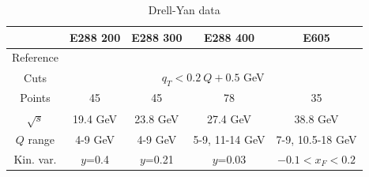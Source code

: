 \documentclass[aps,preprintnumbers,showpacs,nofootinbib,superscriptaddress,floatfix]{revtex4}
\begin{document}
\begin{table}[h]
\begin{center}
\renewcommand{\tabcolsep}{0.4pc} %
\renewcommand{\arraystretch}{1.2} %
\begin{tabular}{|c|c|c|c|c|}
 \hline
 ~                        &  E288 200    &  E288 300        &  E288 400          &  E605                \\
 \hline
Reference               &  \cite{Ito:1980ev}  &   \cite{Ito:1980ev}  &  \cite{Ito:1980ev}  &   \cite{Moreno:1990sf}  \\
\hline
Cuts             & \multicolumn{4}{c|}{$q_T < 0.2\ Q +0.5$ GeV}
\\
 \hline
 Points                   &      45      &   45             &       78           &     35               \\
 \hline
 $\sqrt{s}$               &    19.4 GeV   &   23.8 GeV        &      27.4 GeV    &  38.8 GeV           \\
\hline
$Q$ range                 &  4-9 GeV      &  4-9 GeV         &  5-9, 11-14 GeV   &  7-9, 10.5-18 GeV   \\
 \hline
 Kin. var.           & $y$=0.4         &  $y$=0.21          &   $y$=0.03         &    $-0.1<x_F< 0.2$         \\
\hline
 \end{tabular}
 \caption{Drell-Yan data}
\end{center}
\end{table}
\end{document}
